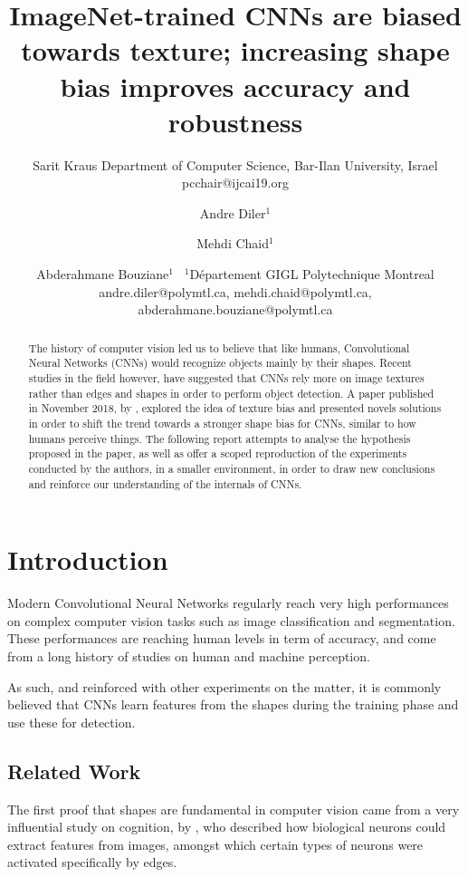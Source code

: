 \documentclass{article}
\title{ImageNet-trained CNNs are biased towards texture; increasing shape bias improves accuracy and robustness}
\author{
    Sarit Kraus
    \affiliations
    Department of Computer Science, Bar-Ilan University, Israel \emails
    pcchair@ijcai19.org
}
\author{
Andre Diler$^1$
\and
Mehdi Chaid$^1$\and
Abderahmane Bouziane$^1$\
\affiliations
$^1$Département GIGL Polytechnique Montreal\\
\emails
andre.diler@polymtl.ca,
mehdi.chaid@polymtl.ca,
abderahmane.bouziane@polymtl.ca
}
\begin{document}
\maketitle

\begin{abstract}
The history of computer vision led us to believe that like humans, 
Convolutional Neural Networks (CNNs) would recognize objects mainly by their shapes.
Recent studies in the field however, have  suggested that CNNs rely more on image textures 
rather than edges and shapes in order to perform object detection. 
A paper published in November 2018, by \cite{geirhos2018imagenettrained}, explored the idea of texture bias
and presented novels solutions in order to shift the trend towards a stronger shape bias for CNNs, similar to 
how humans perceive things.
The following report attempts to analyse the hypothesis proposed in the paper, 
as well as offer a scoped reproduction of the experiments conducted by the authors, in a smaller environment, 
in order to draw new conclusions and reinforce our understanding of the internals of CNNs.
\end{abstract}

\section{Introduction}


Modern Convolutional Neural Networks regularly reach very high performances on complex computer vision tasks 
such as image classification and segmentation.
These performances are reaching human levels in term of accuracy, and come from a long history of studies 
on human and machine perception. \medskip \par 

\noindent
As such, and reinforced with other experiments on the matter, 
it is commonly believed that CNNs learn features from the shapes during the training phase
and use these for detection.

\subsection{Related Work}

\noindent
The first proof that shapes are fundamental in computer vision came from a very influential study on cognition, 
by \cite{hubel1959receptive}, who described how biological neurons could extract features from images,
amongst which certain types of neurons were activated specifically by edges. \medskip \par 
\end{document}
